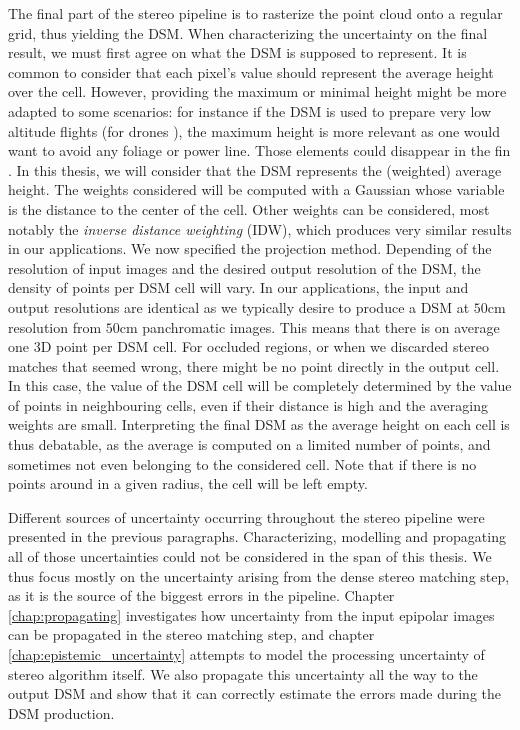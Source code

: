 The final part of the stereo pipeline is to rasterize the point cloud onto a regular grid, thus yielding the DSM. When characterizing the uncertainty on the final result, we must first agree on what the DSM is supposed to represent. It is common to consider that each pixel's value should represent the average height over the cell. However, providing the maximum or minimal height might be more adapted to some scenarios: for instance if the DSM is used to prepare very low altitude flights (for drones \etc), the maximum height is more relevant as one would want to avoid any foliage or power line. Those elements could disappear in the fin . In this thesis, we will consider that the DSM represents the (weighted) average height. The weights considered will be computed with a Gaussian whose variable is the distance to the center of the cell. Other weights can be considered, most notably the \textit{inverse distance weighting} (IDW), which produces very similar results in our applications. We now specified the projection method. Depending of the resolution of input images and the desired output resolution of the DSM, the density of points per DSM cell will vary. In our applications, the input and output resolutions are identical as we typically desire to produce a DSM at $50$cm resolution from $50$cm panchromatic images. This means that there is on average one 3D point per DSM cell. For occluded regions, or when we discarded stereo matches that seemed wrong, there might be no point directly in the output cell. In this case, the value of the DSM cell will be completely determined by the value of points in neighbouring cells, even if their distance is high and the averaging weights are small. Interpreting the final DSM as the average height on each cell is thus debatable, as the average is computed on a limited number of points, and sometimes not even belonging to the considered cell.  Note that if there is no points around in a given radius, the cell will be left empty. 

Different sources of uncertainty occurring throughout the stereo pipeline were presented in the previous paragraphs. Characterizing, modelling and propagating all of those uncertainties could not be considered in the span of this thesis. We thus focus mostly on the uncertainty arising from the dense stereo matching step, as it is the source of the biggest errors in the pipeline. Chapter \ref{chap:propagating} investigates how uncertainty from the input epipolar images can be propagated in the stereo matching step, and chapter \ref{chap:epistemic_uncertainty} attempts to model the processing uncertainty of stereo algorithm itself. We also propagate this uncertainty all the way to the output DSM and show that it can correctly estimate the errors made during the DSM production. 

